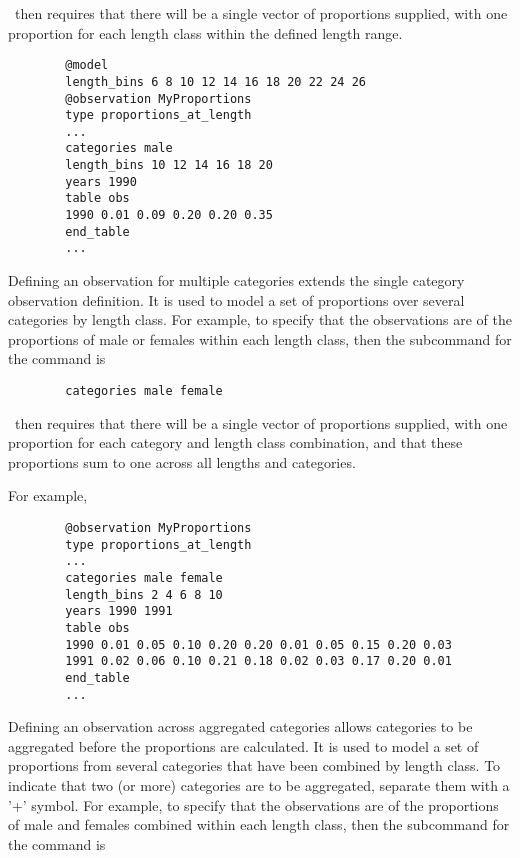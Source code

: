 \CNAME\ then requires that there will be a single vector of proportions supplied, with one proportion for each length class within the defined length range.


{\small{\begin{verbatim}
		@model
		length_bins 6 8 10 12 14 16 18 20 22 24 26
		@observation MyProportions
		type proportions_at_length
		...
		categories male
		length_bins 10 12 14 16 18 20
		years 1990
		table obs
		1990 0.01 0.09 0.20 0.20 0.35 
		end_table
		...
		\end{verbatim}}}

Defining an observation for multiple categories extends the single category observation definition. It is used to model a set of proportions over several categories by length class. For example, to specify that the observations are of the proportions of male or females within each length class, then the subcommand  for the  command is

{\small{\begin{verbatim}
		categories male female
		\end{verbatim}}}

\CNAME\ then requires that there will be a single vector of proportions supplied, with one proportion for each category and length class combination, and that these proportions sum to one across all lengths and categories.

For example,

{\small{\begin{verbatim}
		@observation MyProportions
		type proportions_at_length
		...
		categories male female
		length_bins 2 4 6 8 10
		years 1990 1991
		table obs
		1990 0.01 0.05 0.10 0.20 0.20 0.01 0.05 0.15 0.20 0.03
		1991 0.02 0.06 0.10 0.21 0.18 0.02 0.03 0.17 0.20 0.01
		end_table
		...
		\end{verbatim}}}

Defining an observation across aggregated categories allows categories to be aggregated before the proportions are calculated. It is used to model a set of proportions from several categories that have been combined by length class. To indicate that two (or more) categories are to be aggregated, separate them with a '+' symbol. For example, to specify that the observations are of the proportions of male and females combined within each length class, then the subcommand  for the  command is

